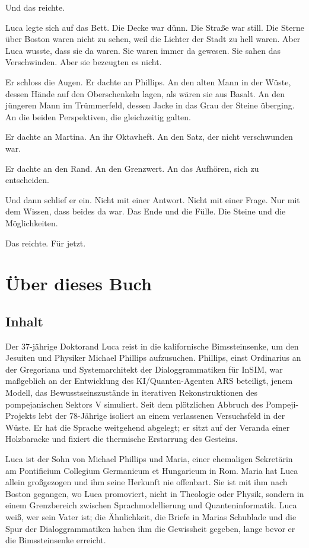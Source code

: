 \documentclass[
  ngerman,
]{article}
\begin{document}
Und das reichte.

Luca legte sich auf das Bett. Die Decke war dünn. Die Straße war still.
Die Sterne über Boston waren nicht zu sehen, weil die Lichter der Stadt
zu hell waren. Aber Luca wusste, dass sie da waren. Sie waren immer da
gewesen. Sie sahen das Verschwinden. Aber sie bezeugten es nicht.

Er schloss die Augen. Er dachte an Phillips. An den alten Mann in der
Wüste, dessen Hände auf den Oberschenkeln lagen, als wären sie aus
Basalt. An den jüngeren Mann im Trümmerfeld, dessen Jacke in das Grau
der Steine überging. An die beiden Perspektiven, die gleichzeitig
galten.

Er dachte an Martina. An ihr Oktavheft. An den Satz, der nicht
verschwunden war.

Er dachte an den Rand. An den Grenzwert. An das Aufhören, sich zu
entscheiden.

Und dann schlief er ein. Nicht mit einer Antwort. Nicht mit einer Frage.
Nur mit dem Wissen, dass beides da war. Das Ende und die Fülle. Die
Steine und die Möglichkeiten.

Das reichte. Für jetzt.

\section{Über dieses Buch}\label{uxfcber-dieses-buch}

\subsection{Inhalt}\label{inhalt}

Der 37-jährige Doktorand Luca reist in die kalifornische Bimssteinsenke,
um den Jesuiten und Physiker Michael Phillips aufzusuchen. Phillips,
einst Ordinarius an der Gregoriana und Systemarchitekt der
Dialoggrammatiken für InSIM, war maßgeblich an der Entwicklung des
KI/Quanten-Agenten ARS beteiligt, jenem Modell, das Bewusstseinszustände
in iterativen Rekonstruktionen des pompejanischen Sektors V simuliert.
Seit dem plötzlichen Abbruch des Pompeji-Projekts lebt der 78-Jährige
isoliert an einem verlassenen Versuchsfeld in der Wüste. Er hat die
Sprache weitgehend abgelegt; er sitzt auf der Veranda einer Holzbaracke
und fixiert die thermische Erstarrung des Gesteins.

Luca ist der Sohn von Michael Phillips und Maria, einer ehemaligen
Sekretärin am Pontificium Collegium Germanicum et Hungaricum in Rom.
Maria hat Luca allein großgezogen und ihm seine Herkunft nie offenbart.
Sie ist mit ihm nach Boston gegangen, wo Luca promoviert, nicht in
Theologie oder Physik, sondern in einem Grenzbereich zwischen
Sprachmodellierung und Quanteninformatik. Luca weiß, wer sein Vater ist;
die Ähnlichkeit, die Briefe in Marias Schublade und die Spur der
Dialoggrammatiken haben ihm die Gewissheit gegeben, lange bevor er die
Bimssteinsenke erreicht.
\end{document}
